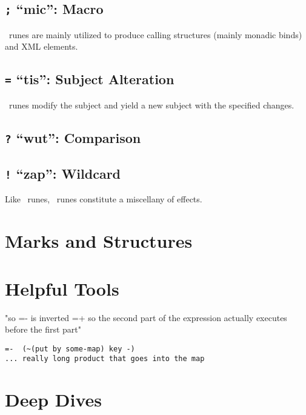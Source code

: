 \subsection{\texttt{;} “mic”:  Macro}

\mic~runes are mainly utilized to produce calling structures (mainly monadic binds) and XML elements.


\subsection{\texttt{=} “tis”:  Subject Alteration}

\tis~runes modify the subject and yield a new subject with the specified changes.

\subsection{\texttt{?} “wut”:  Comparison}

\subsection{\texttt{!} “zap”:  Wildcard}

Like \mic~runes, \pzap~runes constitute a miscellany of effects.

\section{Marks and Structures}

\section{Helpful Tools}


"so =- is inverted =+ so the second part of the expression actually executes before the first part"

\begin{lstlisting}
=-  (~(put by some-map) key -)
... really long product that goes into the map
\end{lstlisting}


\section{Deep Dives}

